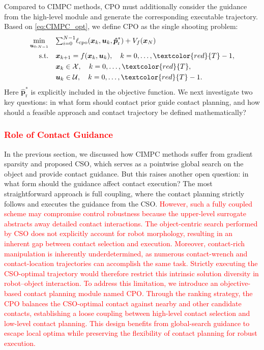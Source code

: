 Compared to CIMPC methods, CPO must additionally consider the guidance from the high-level module and generate the corresponding executable trajectory. Based on \eqref{eq:CIMPC_opt}, we define CPO as the single shooting problem:
\begin{equation}
 \begin{aligned}
\min_{\boldsymbol{u}_{0:N-1}} \quad &
 {\textstyle \sum_{i=0}^{N-1}} \ell_{\text{cpo}}(\boldsymbol{x}_k, \boldsymbol{u}_k, \boldsymbol{\hat{p}}^*_{\text{r}}) + V_f(\boldsymbol{x}_N) \\
\text{s.t.}\quad & \boldsymbol{x}_{k+1} = f(\boldsymbol{x}_k, \boldsymbol{u}_k), \quad k=0,\dots,\textcolor{red}{T}-1, \\
& \boldsymbol{x}_k \in \mathcal{X}, \quad k=0,\dots,\textcolor{red}{T}, \\
& \boldsymbol{u}_k \in \mathcal{U}, \quad k=0,\dots,\textcolor{red}{T}-1.
\end{aligned}\label{equ:origin_cpo_problem}
\end{equation}
Here $\boldsymbol{\hat{p}}^*_{\text{r}}$ is explicitly included in the objective function. We next investigate two key questions: in what form should contact prior guide contact planning, and how should a feasible approach and contact trajectory be defined mathematically?
\subsubsection{\textcolor{red}{Role of Contact Guidance}}
In the previous section, we discussed how CIMPC methods suffer from gradient sparsity and proposed CSO, which serves as a pointwise global search on the object and provide contact guidance. But this raises another open question: in what form should the guidance affect contact execution? The most straightforward approach is full coupling, where the contact planning strictly follows and executes the guidance from the CSO. \textcolor{red}{However, such a fully coupled scheme may compromise control robustness because the upper-level surrogate abstracts away detailed contact interactions. The object-centric search performed by CSO does not explicitly account for robot morphology, resulting in an inherent gap between contact selection and execution. Moreover, contact-rich manipulation is inherently underdetermined, as numerous contact-wrench and contact-location trajectories can accomplish the same task. Strictly executing the CSO-optimal trajectory would therefore restrict this intrinsic solution diversity in robot–object interaction. To address this limitation, we introduce an objective-based contact planning module named CPO. Through the ranking strategy, the CPO balances the CSO-optimal contact against nearby and other candidate contacts, establishing a loose coupling between high-level contact selection and low-level contact planning. This design benefits from global-search guidance to escape local optima while preserving the flexibility of contact planning for robust execution.}

